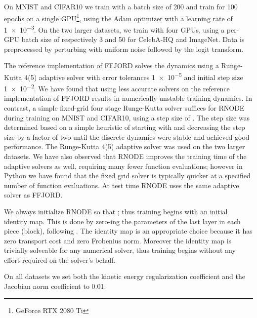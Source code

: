 \documentclass{article}
\theoremstyle{definition}
\theoremstyle{remark}
\begin{document}
On MNIST and CIFAR10 we train with a batch size of 200 and train for 100 epochs on a single GPU\footnote{GeForce RTX 2080 Ti}, using the Adam optimizer \citep{adam} with a
learning rate of \num{1e-3}. On the two larger datasets, we train with four
GPUs, using
a per-GPU batch size of respectively 3 and 50 for CelebA-HQ and ImageNet.  Data is preprocessed by perturbing with uniform
noise followed by the logit transform.

The reference implementation of FFJORD solves the dynamics using a Runge-Kutta 4(5) adaptive solver \cite{dormand1980family} with error tolerances \num{1e-5}
and initial step size \num{1e-2}. We have found that using less accurate solvers
on the reference implementation of FFJORD results in numerically unstable
training dynamics. In contrast, a
simple fixed-grid four stage Runge-Kutta solver suffices for RNODE during
training on MNIST and CIFAR10, using a step size of
. The step size was determined based on a simple heuristic of starting
with  and decreasing the step size by a factor of two until the discrete
dynamics were stable and achieved good performance. The Runge-Kutta 4(5)
adaptive solver
was used on the two larger datasets. We have also observed that
RNODE improves the training time of the adaptive solvers as well, requiring many
fewer function evaluations; however in Python we have found that the fixed grid
solver is typically quicker at a specified number of function evaluations. At
test time RNODE uses the same adaptive solver as FFJORD.

We always initialize RNODE so that ; thus training
begins with an initial identity map. This is done by zero-ing the parameters of
the last layer in each piece (block), following \citet{goyal17}. The identity map is an appropriate choice
because it has zero transport cost and zero
Frobenius norm. Moreover the identity map is trivially solveable for any
numerical solver, thus training begins without any effort required on the
solver's behalf.

On all datasets we set both the kinetic energy regularization
coefficient  and the Jacobian norm coefficient  to 0.01.
\end{document}
